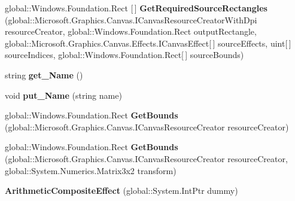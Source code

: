 \begin{DoxyCompactItemize}
global\+::\+Windows.\+Foundation.\+Rect \mbox{[}$\,$\mbox{]} {\bfseries Get\+Required\+Source\+Rectangles} (global\+::\+Microsoft.\+Graphics.\+Canvas.\+I\+Canvas\+Resource\+Creator\+With\+Dpi resource\+Creator, global\+::\+Windows.\+Foundation.\+Rect output\+Rectangle, global\+::\+Microsoft.\+Graphics.\+Canvas.\+Effects.\+I\+Canvas\+Effect\mbox{[}$\,$\mbox{]} source\+Effects, uint\mbox{[}$\,$\mbox{]} source\+Indices, global\+::\+Windows.\+Foundation.\+Rect\mbox{[}$\,$\mbox{]} source\+Bounds)
\item 
\mbox{\label{class_microsoft_1_1_graphics_1_1_canvas_1_1_effects_1_1_arithmetic_composite_effect_aa9cafb36931bdd6a59f351a2a3b8b145}} 
string {\bfseries get\+\_\+\+Name} ()
\item 
\mbox{\label{class_microsoft_1_1_graphics_1_1_canvas_1_1_effects_1_1_arithmetic_composite_effect_a746f58e0fb29048d54319e6dc74d65e3}} 
void {\bfseries put\+\_\+\+Name} (string name)
\item 
\mbox{\label{class_microsoft_1_1_graphics_1_1_canvas_1_1_effects_1_1_arithmetic_composite_effect_a424c1b1e1b879fc96a6293eb16416937}} 
global\+::\+Windows.\+Foundation.\+Rect {\bfseries Get\+Bounds} (global\+::\+Microsoft.\+Graphics.\+Canvas.\+I\+Canvas\+Resource\+Creator resource\+Creator)
\item 
\mbox{\label{class_microsoft_1_1_graphics_1_1_canvas_1_1_effects_1_1_arithmetic_composite_effect_ae11051d53e88d2ea9c48b02a05449c08}} 
global\+::\+Windows.\+Foundation.\+Rect {\bfseries Get\+Bounds} (global\+::\+Microsoft.\+Graphics.\+Canvas.\+I\+Canvas\+Resource\+Creator resource\+Creator, global\+::\+System.\+Numerics.\+Matrix3x2 transform)
\item 
\mbox{\label{class_microsoft_1_1_graphics_1_1_canvas_1_1_effects_1_1_arithmetic_composite_effect_a0b741230609e3e96b63205529cafcc0e}} 
{\bfseries Arithmetic\+Composite\+Effect} (global\+::\+System.\+Int\+Ptr dummy)
\item 

\end{DoxyCompactItemize}
